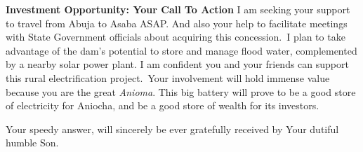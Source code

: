 \begin{fullwidth}
    \textbf{Investment Opportunity: Your Call To Action}
    \vspace{0.4cm}
    I am seeking your support to travel from Abuja to Asaba ASAP. And also your help to facilitate meetings with State
    Government officials about acquiring this concession.\ I plan to take advantage of the dam's potential to store and
    manage flood water, complemented by a nearby solar power plant.
    \vspace{0.4cm}
    I am confident you and your friends can support this rural electrification project.\ Your involvement will hold immense
    value because you are the great \textit{Anioma}.
    \vspace{0.4cm}
    This big battery will prove to be a good store of electricity for Aniocha, and be a good store of wealth for its investors.
    \vspace{0.4cm}

    Your speedy answer, will sincerely be ever gratefully received by
    \vspace{0.4cm}
    Your dutiful humble Son.

\end{fullwidth}
\linenumbers